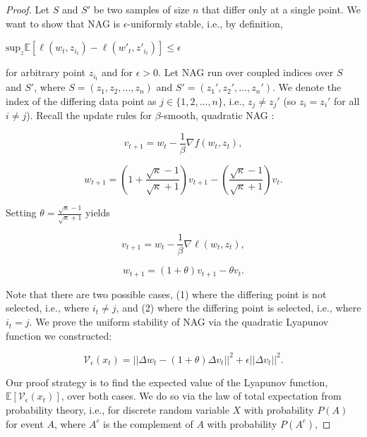 \documentclass[twoside,11pt]{article}
\begin{document}
\begin{proof}
Let $S$ and $S'$ be two samples of size $n$ that differ only at a single point. We want to show that NAG is $\epsilon$-uniformly stable, i.e., by definition,

\begin{center}
$\text{sup}_z \mathbb{E}[\ell(w_t, z_{i_t}) - \ell(w'_t, z'_{i_t})] \leq \epsilon$
\end{center}

\noindent
for arbitrary point $z_{i_t}$ and for $\epsilon > 0$. Let NAG run over coupled indices over $S$ and $S'$, where $S = (z_1, z_2, ... , z_n)$ and $S' = (z_1', z_2', ... , z_n')$. We denote the index of the differing data point as $j \in \{1,2, ... , n\}$, i.e., $z_j \neq z_j'$ (so $z_i = z_i'$ for all $i \neq j$). Recall the update rules for $\beta$-smooth, quadratic NAG \cite{Bub15}:

\begin{equation}
v_{t+1} = w_t - \frac{1}{\beta} \nabla f(w_t, z_t),
\end{equation}

\begin{equation}
w_{t+1} = (1 + \frac{\sqrt{\kappa}-1}{\sqrt{\kappa}+1})v_{t+1} - (\frac{\sqrt{\kappa}-1}{\sqrt{\kappa}+1})v_t.
\end{equation}

\noindent
Setting $\theta = \frac{\sqrt{\kappa}-1}{\sqrt{\kappa}+1}$ yields

\begin{equation}
v_{t+1} = w_t - \frac{1}{\beta} \nabla \ell (w_t, z_t),
\end{equation}

\begin{equation}
w_{t+1} = (1+\theta)v_{t+1} - \theta v_t.
\end{equation}

\noindent
Note that there are two possible cases, (1) where the differing point is not selected, i.e., where $i_t \neq j$, and (2) where the differing point is selected, i.e., where $i_t = j$. We prove the uniform stability of NAG via the quadratic Lyapunov function we constructed: 

\begin{equation}
\mathcal{V}_{\epsilon}(x_t) = ||\Delta w_t - (1+\theta)\Delta v_t||^2+\epsilon||\Delta v_t||^2.
\end{equation}

\noindent
Our proof strategy is to find the expected value of the Lyapunov function, $\mathbb{E}[\mathcal{V}_{\epsilon}(x_t)]$, over both cases. We do so via the law of total expectation from probability theory, i.e., for discrete random variable $X$ with probability $P(A)$ for event $A$, where $A^c$ is the complement of $A$ with probability $P(A^c)$,


\end{proof}
\end{document}
